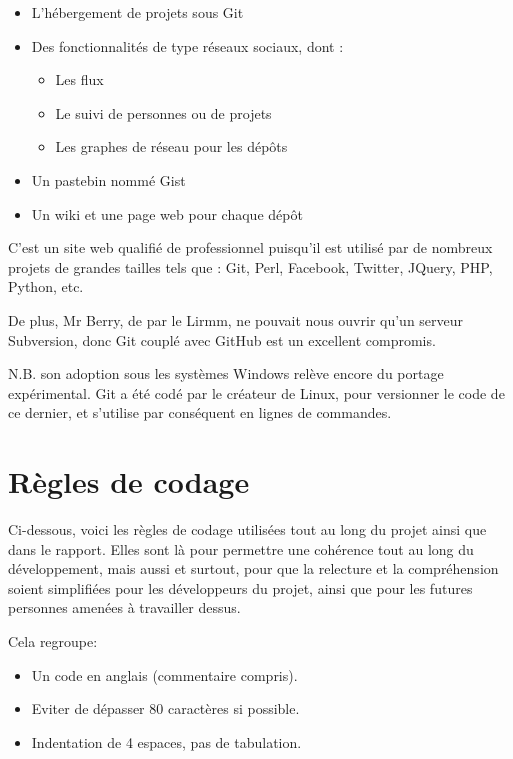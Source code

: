     \begin{itemize}
    \item L'hébergement de projets sous Git
    \item Des fonctionnalités de type réseaux sociaux, dont :
        \begin{itemize}
        \item Les flux
        \item Le suivi de personnes ou de projets
        \item Les graphes de réseau pour les dépôts
        \end{itemize}
    \item Un pastebin nommé Gist
    \item Un wiki et une page web pour chaque dépôt
    \end{itemize}

C'est un site web qualifié de professionnel puisqu'il est utilisé par de 
nombreux projets de grandes tailles tels que : Git, Perl, Facebook, Twitter,
JQuery, PHP, Python, etc.

De plus, Mr Berry, de par le Lirmm, ne pouvait nous ouvrir qu'un serveur
Subversion, donc Git couplé avec GitHub est un excellent compromis.

N.B. son adoption sous les systèmes Windows relève encore du portage
expérimental. Git a été codé par le créateur de Linux, pour versionner le code
de ce dernier, et s'utilise par conséquent en lignes de commandes.

    \section{Règles de codage}

Ci-dessous, voici les règles de codage utilisées tout au long du projet
ainsi que dans le rapport. Elles sont là pour permettre une cohérence tout au
long du développement, mais aussi et surtout, pour que la relecture et la 
compréhension soient simplifiées pour les développeurs du projet, ainsi que pour les
futures personnes amenées à travailler dessus.

Cela regroupe:

    \begin{itemize}
    \item Un code en anglais (commentaire compris).
    \item Eviter de dépasser 80 caractères si possible.
    \item Indentation de 4 espaces, pas de tabulation.
    \end{itemize}

